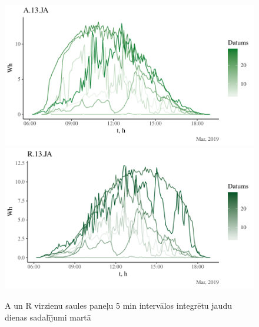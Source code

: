 \begin{figure}[h]
    \centering
    \includegraphics[width=\linewidth]{figures/sol_day/mar_A13JA.pdf}
    \includegraphics[width=\linewidth]{figures/sol_day/mar_R13JA.pdf}
    \caption{A un R virzienu saules paneļu 5 min intervālos integrētu jaudu dienas sadalījumi martā}
    \label{fig:mar_ar}
\end{figure}

